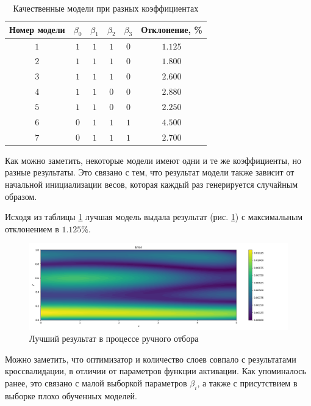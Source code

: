 \begin{table}[ht]
    \centering
    \caption{Качественные модели при разных коэффициентах}
    \begin{tabular}{ |c|c|c|c|c|c| } 
        \hline
        Номер модели & $\beta_0$ & $\beta_1$ & $\beta_2$ & $\beta_3$ & Отклонение, \% \\
        \hline
        $1$ & $1$ & $1$ & $1$ & $0$ & $1.125$ \\ 
        \hline
        $2$ & $1$ & $1$ & $1$ & $0$ & $1.800$ \\ 
        \hline
        $3$ & $1$ & $1$ & $1$ & $0$ & $2.600$ \\ 
        \hline
        $4$ & $1$ & $1$ & $0$ & $0$ & $2.880$ \\ 
        \hline
        $5$ & $1$ & $1$ & $0$ & $0$ & $2.250$ \\ 
        \hline
        $6$ & $0$ & $1$ & $1$ & $1$ & $4.500$ \\ 
        \hline
        $7$ & $0$ & $1$ & $1$ & $1$ & $2.700$ \\ 
        \hline
    \end{tabular}
    \label{table:couette_abu_best_models}
\end{table}

Как можно заметить, некоторые модели имеют одни и те же коэффициенты, но
разные результаты. Это связано с тем, что результат модели также 
зависит от начальной инициализации весов, которая каждый раз
генерируется случайным образом.

Исходя из таблицы \ref{table:couette_abu_best_models} лучшая модель
выдала результат (рис. \ref{fig:couette_abu_best_model}) с максимальным отклонением в $1.125\%$.

\begin{figure}[ht]
    \includegraphics{data/couette_abu_error_best_model.png}
    \caption{Лучший результат в процессе ручного отбора}
    \label{fig:couette_abu_best_model}
\end{figure}

Можно заметить, что оптимизатор и количество слоев совпало
с результатами кроссвалидации, в отличии от параметров
функции активации. Как упоминалось ранее, это связано с
малой выборкой параметров $\beta_i$, а также с присутствием
в выборке плохо обученных моделей. 

